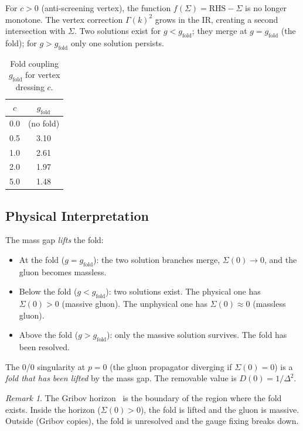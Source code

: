 \documentclass[11pt]{article}
\theoremstyle{definition}
\theoremstyle{remark}
\newtheorem{remark}[theorem]{Remark}
\begin{document}
For $c > 0$ (anti-screening vertex), the function
$f(\Sigma) = \mathrm{RHS} - \Sigma$ is no longer monotone.
The vertex correction $\Gamma(k)^2$ grows in the IR,
creating a second intersection with $\Sigma$. Two solutions
exist for $g < g_{\mathrm{fold}}$; they merge at
$g = g_{\mathrm{fold}}$ (the fold); for $g > g_{\mathrm{fold}}$
only one solution persists.

\begin{table}[h]
\centering
\caption{Fold coupling $g_{\mathrm{fold}}$ for vertex dressing $c$.}
\label{tab:fold}
\begin{tabular}{cc}
\hline
$c$ & $g_{\mathrm{fold}}$ \\
\hline
0.0 & (no fold) \\
0.5 & 3.10 \\
1.0 & 2.61 \\
2.0 & 1.97 \\
5.0 & 1.48 \\
\hline
\end{tabular}
\end{table}

\subsection{Physical Interpretation}

The mass gap \emph{lifts} the fold:
\begin{itemize}
\item At the fold ($g = g_{\mathrm{fold}}$): the two solution
  branches merge, $\Sigma(0) \to 0$, and the gluon becomes massless.
\item Below the fold ($g < g_{\mathrm{fold}}$): two solutions exist.
  The physical one has $\Sigma(0) > 0$ (massive gluon). The
  unphysical one has $\Sigma(0) \approx 0$ (massless gluon).
\item Above the fold ($g > g_{\mathrm{fold}}$): only the massive
  solution survives. The fold has been resolved.
\end{itemize}

The 0/0 singularity at $p = 0$ (the gluon propagator diverging if
$\Sigma(0) = 0$) is a \emph{fold that has been lifted} by the mass
gap. The removable value is $D(0) = 1/\Delta^2$.

\begin{remark}
The Gribov horizon~\cite{gribov} is the boundary of the region
where the fold exists. Inside the horizon ($\Sigma(0) > 0$), the
fold is lifted and the gluon is massive. Outside (Gribov copies),
the fold is unresolved and the gauge fixing breaks down.
\end{remark}
\end{document}
